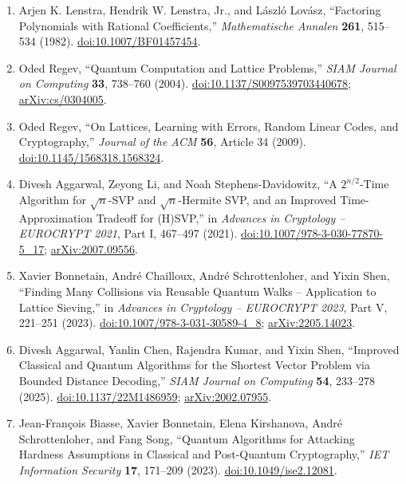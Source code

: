 \begin{enumerate}[label={},leftmargin=4.8em,labelsep=0.5em]
  \footnotesize
  \item[\textup{[LLL82]}]\label{ref:36ac-lll}
  Arjen K. Lenstra, Hendrik W. Lenstra, Jr., and L\'aszl\'o Lov\'asz,
``Factoring Polynomials with Rational Coefficients,'' \emph{Mathematische
Annalen} \textbf{261}, 515--534 (1982).
\href{https://doi.org/10.1007/BF01457454}{doi:10.1007/BF01457454}.

  \item[\textup{[Reg04]}]\label{ref:36ac-regev04}
  Oded Regev, ``Quantum Computation and Lattice Problems,'' \emph{SIAM
Journal on Computing} \textbf{33}, 738--760 (2004).
\href{https://doi.org/10.1137/S0097539703440678}{doi:10.1137/S0097539703440678};
\href{https://arxiv.org/abs/cs/0304005}{arXiv:cs/0304005}.

  \item[\textup{[Reg09]}]\label{ref:36ac-regev09}
  Oded Regev, ``On Lattices, Learning with Errors, Random Linear Codes,
and Cryptography,'' \emph{Journal of the ACM} \textbf{56}, Article 34
(2009).
\href{https://doi.org/10.1145/1568318.1568324}{doi:10.1145/1568318.1568324}.

  \item[\textup{[ALS21]}]\label{ref:36ac-als}
  Divesh Aggarwal, Zeyong Li, and Noah Stephens-Davidowitz, ``A
$2^{n/2}$-Time Algorithm for $\sqrt{n}$-SVP and $\sqrt{n}$-Hermite SVP, and
an Improved Time-Approximation Tradeoff for (H)SVP,'' in \emph{Advances in
Cryptology -- EUROCRYPT 2021}, Part I, 467--497 (2021).
\href{https://doi.org/10.1007/978-3-030-77870-5_17}{doi:10.1007/978-3-030-77870-5_17};
\href{https://arxiv.org/abs/2007.09556}{arXiv:2007.09556}.

  \item[\textup{[BCSS23]}]\label{ref:36ac-bcss}
  Xavier Bonnetain, Andr\'e Chailloux, Andr\'e Schrottenloher, and Yixin
Shen, ``Finding Many Collisions via Reusable Quantum Walks -- Application
to Lattice Sieving,'' in \emph{Advances in Cryptology -- EUROCRYPT 2023},
Part V, 221--251 (2023).
\href{https://doi.org/10.1007/978-3-031-30589-4_8}{doi:10.1007/978-3-031-30589-4_8};
\href{https://arxiv.org/abs/2205.14023}{arXiv:2205.14023}.

  \item[\textup{[ACKS25]}]\label{ref:36ac-acks}
  Divesh Aggarwal, Yanlin Chen, Rajendra Kumar, and Yixin Shen,
``Improved Classical and Quantum Algorithms for the Shortest Vector Problem
via Bounded Distance Decoding,'' \emph{SIAM Journal on Computing}
\textbf{54}, 233--278 (2025).
\href{https://doi.org/10.1137/22M1486959}{doi:10.1137/22M1486959};
\href{https://arxiv.org/abs/2002.07955}{arXiv:2002.07955}.

  \item[\textup{[Bia23]}]\label{ref:36ac-biasse}
  Jean-Fran\c{c}ois Biasse, Xavier Bonnetain, Elena Kirshanova, Andr\'e
Schrottenloher, and Fang Song, ``Quantum Algorithms for Attacking Hardness
Assumptions in Classical and Post-Quantum Cryptography,'' \emph{IET
Information Security} \textbf{17}, 171--209 (2023).
\href{https://doi.org/10.1049/ise2.12081}{doi:10.1049/ise2.12081}.
\end{enumerate}


